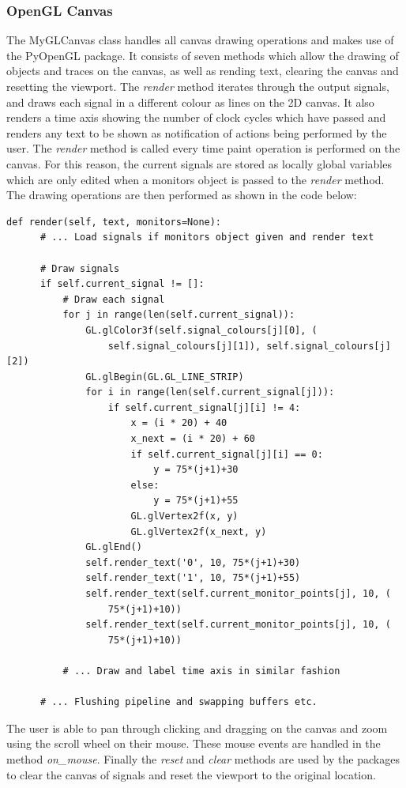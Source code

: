 \documentclass{article}					%
\begin{document}
\subsubsection{OpenGL Canvas}
The MyGLCanvas class handles all canvas drawing operations and makes use of the PyOpenGL package. It consists of seven methods which allow the drawing of objects and traces on the canvas, as well as rending text, clearing the canvas and resetting the viewport. The \textit{render} method iterates through the output signals, and draws each signal in a different colour as lines on the 2D canvas. It also renders a time axis showing the number of clock cycles which have passed and renders any text to be shown as notification of actions being performed by the user. The \textit{render} method is called every time paint operation is performed on the canvas. For this reason, the current signals are stored as locally global variables which are only edited when a monitors object is passed to the \textit{render} method. The drawing operations are then performed as shown in the code below:
\begin{verbatim}
def render(self, text, monitors=None):
      # ... Load signals if monitors object given and render text

      # Draw signals
      if self.current_signal != []:
          # Draw each signal
          for j in range(len(self.current_signal)):
              GL.glColor3f(self.signal_colours[j][0], (
                  self.signal_colours[j][1]), self.signal_colours[j][2])
              GL.glBegin(GL.GL_LINE_STRIP)
              for i in range(len(self.current_signal[j])):
                  if self.current_signal[j][i] != 4:
                      x = (i * 20) + 40
                      x_next = (i * 20) + 60
                      if self.current_signal[j][i] == 0:
                          y = 75*(j+1)+30
                      else:
                          y = 75*(j+1)+55
                      GL.glVertex2f(x, y)
                      GL.glVertex2f(x_next, y)
              GL.glEnd()
              self.render_text('0', 10, 75*(j+1)+30)
              self.render_text('1', 10, 75*(j+1)+55)
              self.render_text(self.current_monitor_points[j], 10, (
                  75*(j+1)+10))
              self.render_text(self.current_monitor_points[j], 10, (
                  75*(j+1)+10))

          # ... Draw and label time axis in similar fashion

      # ... Flushing pipeline and swapping buffers etc.
\end{verbatim}
The user is able to pan through clicking and dragging on the canvas and zoom using the scroll wheel on their mouse. These mouse events are handled in the method \textit{on\_mouse}. Finally the \textit{reset} and \textit{clear} methods are used by the packages to clear the canvas of signals and reset the viewport to the original location.
\end{document}
